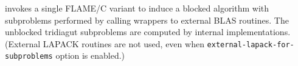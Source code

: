 \begin{flaspec}
{\flatridiagut invokes a single FLAME/C variant to induce a blocked algorithm
with subproblems performed by calling wrappers to external BLAS routines.
The unblocked {\sc tridiagut} subproblems are computed by internal
implementations.
(External LAPACK routines are not used, even when
{\tt external-lapack-for-subproblems} option is enabled.)
}
\begin{params}
\end{params}
\end{flaspec}


